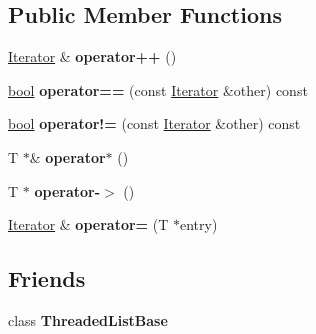 \subsection*{Public Member Functions}
\begin{DoxyCompactItemize}
\item 
\mbox{\label{classv8_1_1base_1_1ThreadedListBase_1_1Iterator_a3a7ea8c08ecb4b52c3625681416c6303}} 
\mbox{\hyperlink{classv8_1_1base_1_1ThreadedListBase_1_1Iterator}{Iterator}} \& {\bfseries operator++} ()
\item 
\mbox{\label{classv8_1_1base_1_1ThreadedListBase_1_1Iterator_a8da9f0493326d4c854c5330c4523de34}} 
\mbox{\hyperlink{classbool}{bool}} {\bfseries operator==} (const \mbox{\hyperlink{classv8_1_1base_1_1ThreadedListBase_1_1Iterator}{Iterator}} \&other) const
\item 
\mbox{\label{classv8_1_1base_1_1ThreadedListBase_1_1Iterator_aa0c180d648dc5e42c6d9caac311b9ca0}} 
\mbox{\hyperlink{classbool}{bool}} {\bfseries operator!=} (const \mbox{\hyperlink{classv8_1_1base_1_1ThreadedListBase_1_1Iterator}{Iterator}} \&other) const
\item 
\mbox{\label{classv8_1_1base_1_1ThreadedListBase_1_1Iterator_a0a0f4e2b8f533a42b46df6b0b6a3fbf5}} 
T $\ast$\& {\bfseries operator$\ast$} ()
\item 
\mbox{\label{classv8_1_1base_1_1ThreadedListBase_1_1Iterator_ae9d7a1164c379989141bbf5b0eabcc2f}} 
T $\ast$ {\bfseries operator-\/$>$} ()
\item 
\mbox{\label{classv8_1_1base_1_1ThreadedListBase_1_1Iterator_a9a6a576fc5af4a99a32668a32e19a6c6}} 
\mbox{\hyperlink{classv8_1_1base_1_1ThreadedListBase_1_1Iterator}{Iterator}} \& {\bfseries operator=} (T $\ast$entry)
\end{DoxyCompactItemize}
\subsection*{Friends}
\begin{DoxyCompactItemize}
\item 
\mbox{\label{classv8_1_1base_1_1ThreadedListBase_1_1Iterator_a212195f95aeeefa4942d777bce073178}} 
class {\bfseries Threaded\+List\+Base}
\end{DoxyCompactItemize}


